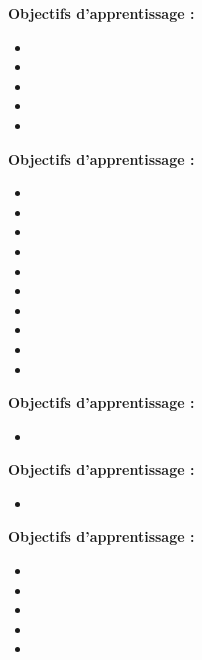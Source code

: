 \par\noindent\textbf{Objectifs d'apprentissage :}
\begin{itemize}
    \item \useobj[C4A3ca]
    \item \useobj[C4A3cb]
    \item \useobj[C4A3ec]
    \item \useobj[C4A3ed]
    \item \useobj[C4A3ef]
\end{itemize}
\endsequence

\par\noindent\textbf{Objectifs d'apprentissage :}
\begin{itemize}
    \item \useobj[C4D3ab]
    \item \useobj[C4D3ac]
    \item \useobj[C4D3ba]
    \item \useobj[C4D3bb]
    \item \useobj[C4D3bc]
    \item \useobj[C4D3bd]
    \item \useobj[C4D3be]
    \item \useobj[C4D3bf]
    \item \useobj[C4D3bg]
    \item \useobj[C4D3bh]
\end{itemize}
\endsequence

\par\noindent\textbf{Objectifs d'apprentissage :}
\begin{itemize}
    \item \useobj[C4B3cb]
\end{itemize}
\endsequence

\par\noindent\textbf{Objectifs d'apprentissage :}
\begin{itemize}
    \item \useobj[C4B3ca]
\end{itemize}
\endsequence

\par\noindent\textbf{Objectifs d'apprentissage :}
\begin{itemize}
    \item \useobj[C4A3ab]
    \item \useobj[C4A3ba]
    \item \useobj[C4A3bb]
    \item \useobj[C4A3bc]
    \item \useobj[C4A3bd]
\end{itemize}
\endsequence

